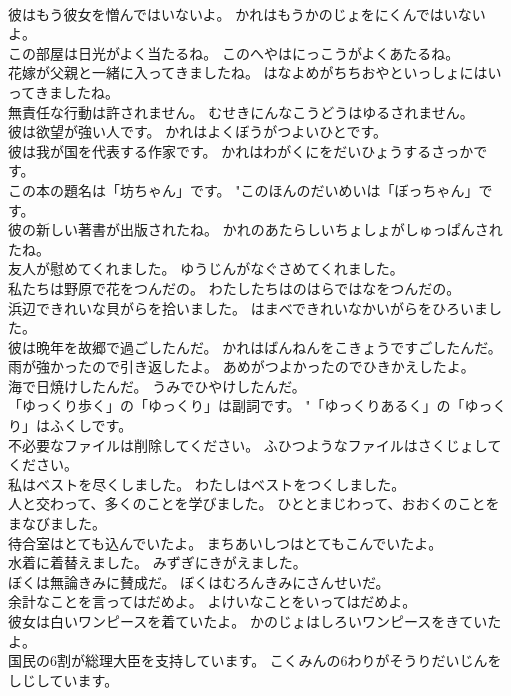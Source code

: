 \documentclass[8pt]{extreport}
\begin{document}
\begin{CJK}{UTF8}{min}
\\	彼はもう彼女を憎んではいないよ。	かれはもうかのじょをにくんではいないよ。 
\\	この部屋は日光がよく当たるね。	このへやはにっこうがよくあたるね。 
\\	花嫁が父親と一緒に入ってきましたね。	はなよめがちちおやといっしょにはいってきましたね。 
\\	無責任な行動は許されません。	むせきにんなこうどうはゆるされません。 
\\	彼は欲望が強い人です。	かれはよくぼうがつよいひとです。 
\\	彼は我が国を代表する作家です。	かれはわがくにをだいひょうするさっかです。 
\\	この本の題名は「坊ちゃん」です。	"このほんのだいめいは「ぼっちゃん」です。 
\\	彼の新しい著書が出版されたね。	かれのあたらしいちょしょがしゅっぱんされたね。 
\\	友人が慰めてくれました。	ゆうじんがなぐさめてくれました。 
\\	私たちは野原で花をつんだの。	わたしたちはのはらではなをつんだの。 
\\	浜辺できれいな貝がらを拾いました。	はまべできれいなかいがらをひろいました。 
\\	彼は晩年を故郷で過ごしたんだ。	かれはばんねんをこきょうですごしたんだ。 
\\	雨が強かったので引き返したよ。	あめがつよかったのでひきかえしたよ。 
\\	海で日焼けしたんだ。	うみでひやけしたんだ。 
\\	「ゆっくり歩く」の「ゆっくり」は副詞です。	"「ゆっくりあるく」の「ゆっくり」はふくしです。 
\\	不必要なファイルは削除してください。	ふひつようなファイルはさくじょしてください。 
\\	私はベストを尽くしました。	わたしはベストをつくしました。 
\\	人と交わって、多くのことを学びました。	ひととまじわって、おおくのことをまなびました。 
\\	待合室はとても込んでいたよ。	まちあいしつはとてもこんでいたよ。 
\\	水着に着替えました。	みずぎにきがえました。 
\\	ぼくは無論きみに賛成だ。	ぼくはむろんきみにさんせいだ。 
\\	余計なことを言ってはだめよ。	よけいなことをいってはだめよ。 
\\	彼女は白いワンピースを着ていたよ。	かのじょはしろいワンピースをきていたよ。 
\\	国民の6割が総理大臣を支持しています。	こくみんの6わりがそうりだいじんをしじしています。 

\end{CJK}
\end{document}
